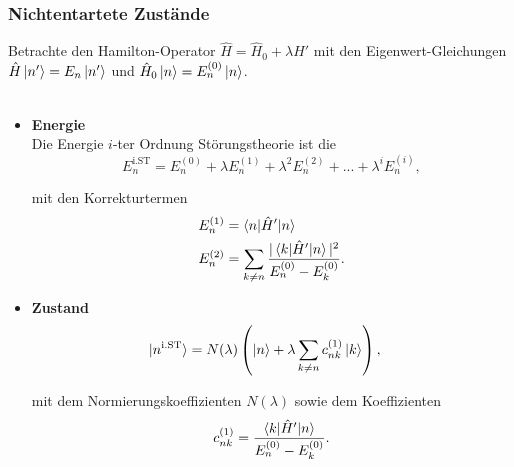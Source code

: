 \documentclass{article}
\newcommand{\lr}[1]{\left(#1\right)}
\begin{document}
\subsubsection{Nichtentartete Zustände}
Betrachte den Hamilton-Operator $\hat{H} = \hat{H}_0 + \lambda \hat{H}'$ mit den Eigenwert-Gleichungen $\hat{H} \ket{n'} = E_n \ket{n'}$ und $\hat{H}_0 \ket{n} = E_n^{(0)} \ket{n}$.\\
\\
	\begin{itemize}
		\item \textbf{Energie}\\
		Die Energie $i$-ter Ordnung Störungstheorie ist die 
			\begin{equation}
				E_n^{\text{i.ST}} = E_n^{(0)} + \lambda E_n^{(1)} + \lambda^2 E_n^{(2)} + ... + \lambda^i E_n^{(i)},
			\end{equation}
		
		mit den Korrekturtermen
			\begin{align}
				E_n^{(1)} &= \braket{n | \hat{H}' | n} \\
				E_n^{(2)} &= \sum_{k\neq n} \frac{ |\braket{k | \hat{H}' | n}|^2 }{E_n^{(0)} - E_k^{(0)}}.
		\end{align}


		\item \textbf{Zustand}
			\begin{align}
				\ket{n^{\text{i.ST}}} &= N(\lambda) \lr{ \ket{n} + \lambda \sum_{k\neq n} c_{nk}^{(1)} \ket{k} },
			\end{align}
		
		mit dem Normierungskoeffizienten $N(\lambda)$ sowie dem Koeffizienten
			\begin{equation}
				c_{nk}^{(1)} = \frac{\braket{k | \hat{H}' | n}}{E_n^{(0)} - E_k^{(0)}}.
			\end{equation}
	\end{itemize}


\newpage
\end{document}
